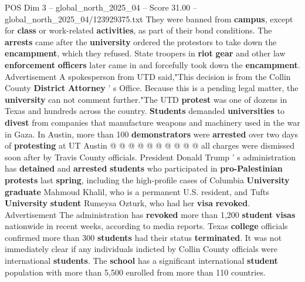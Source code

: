 \begin{textsample}{POS Dim 3 – global\_north\_2025\_04 – Score 31.00 – global\_north\_2025\_04/123929375.txt}
They were banned from \textbf{campus}, except for \textbf{class} or work-related \textbf{activities}, as part of their bond conditions.
The \textbf{arrests} came after the \textbf{university} ordered the protestors to take down the \textbf{encampment}, which they refused.
State troopers in \textbf{riot} \textbf{gear} and other law \textbf{enforcement} \textbf{officers} later came in and forcefully took down the \textbf{encampment}.
Advertisement A spokesperson from UTD said,"This decision is from the Collin County \textbf{District} \textbf{Attorney} ' s Office.
Because this is a pending legal matter, the \textbf{university} can not comment further."The UTD \textbf{protest} was one of dozens in Texas and hundreds across the country. \textbf{Students} demanded \textbf{universities} to \textbf{divest} from companies that manufacture weapons and machinery used in the war in Gaza.
In Austin, more than 100 \textbf{demonstrators} were \textbf{arrested} over two days of \textbf{protesting} at UT Austin @ @ @ @ @ @ @ @ @ @ all charges were dismissed soon after by Travis County officials.
President Donald Trump ' s administration has \textbf{detained} and \textbf{arrested} \textbf{students} who participated in \textbf{pro-Palestinian} \textbf{protests} last \textbf{spring}, including the high-profile cases of Columbia \textbf{University} \textbf{graduate} Mahmoud Khalil, who is a permanent U.S. resident, and Tufts \textbf{University} \textbf{student} Rumeysa Ozturk, who had her \textbf{visa} \textbf{revoked}.
Advertisement The administration has \textbf{revoked} more than 1,200 \textbf{student} \textbf{visas} nationwide in recent weeks, according to media reports.
Texas \textbf{college} officials confirmed more than 300 \textbf{students} had their status \textbf{terminated}.
It was not immediately clear if any individuals indicted by Collin County officials were international \textbf{students}.
The \textbf{school} has a significant international \textbf{student} population with more than 5,500 enrolled from more than 110 countries.

\end{textsample}
